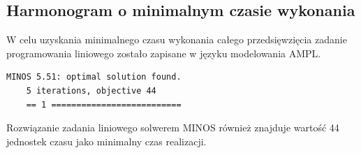 \documentclass[
    12pt, %
]{../fphw}
\begin{document}
\subsection{Harmonogram o minimalnym czasie wykonania}
W celu uzyskania minimalnego czasu wykonania całego przedsięwzięcia zadanie programowania liniowego
zostało zapisane w języku modelowania AMPL.


\begin{lstlisting}[caption=Rozwiązanie znalezione solwerem minos]
    MINOS 5.51: optimal solution found.
    5 iterations, objective 44
    == 1 ==========================
\end{lstlisting}
Rozwiązanie zadania liniowego solwerem MINOS również znajduje wartość 44 jednostek czasu jako minimalny czas realizacji.
\end{document}
